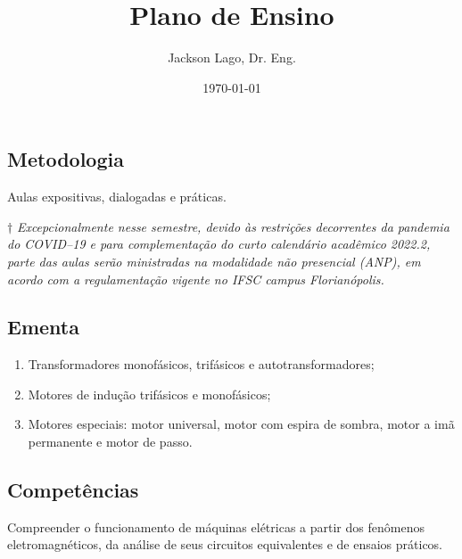 \documentclass[10pt, a4paper]{article}
\author{Jackson Lago, Dr. Eng.}
\title{Plano de Ensino}
\subtitle{\thesubject}
\date{\today}
\begin{document}
    \capa



    \subsection*{Metodologia}

    Aulas expositivas, dialogadas e práticas.

    \hspace{3mm}


    $\dagger$ \emph{Excepcionalmente nesse semestre, devido às restrições decorrentes da pandemia do COVID--19 e para complementação do curto calendário
    acadêmico 2022.2, parte das aulas serão ministradas na modalidade não presencial (ANP), em acordo com a regulamentação vigente no IFSC
    campus Florianópolis.}

    \subsection*{Ementa}
    \begin{enumerate}[label=\roman*)]
        \item Transformadores monofásicos, trifásicos e autotransformadores;
        \item Motores de indução trifásicos e monofásicos;
        \item Motores especiais: motor universal, motor com espira de sombra, motor a imã permanente e motor de passo.
    \end{enumerate}


    \subsection*{Competências}

    Compreender o funcionamento de máquinas elétricas a partir dos fenômenos eletromagnéticos, da análise de seus circuitos equivalentes e
    de ensaios práticos.
\end{document}
